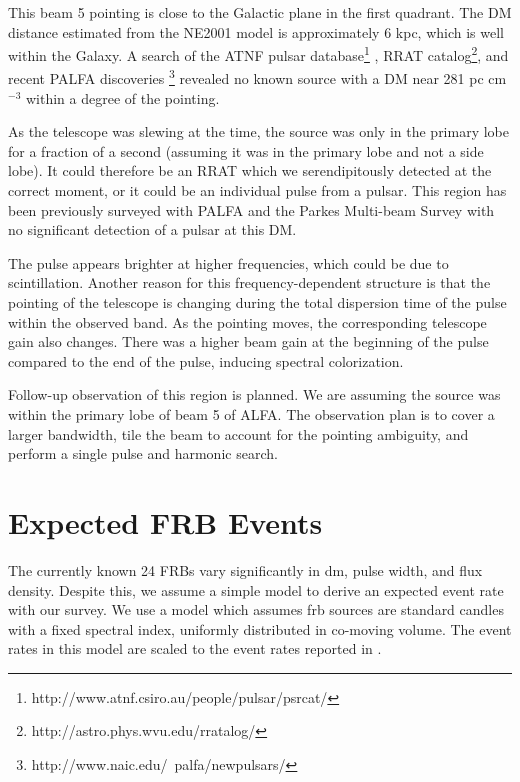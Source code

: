 \documentclass[a4paper,fleqn,usenatbib]{mnras}
\begin{document}
This beam 5 pointing is close to the Galactic plane in the first quadrant. The
DM distance estimated from the NE2001 model \citep{2002astro.ph..7156C} is
approximately 6 kpc, which is well within the Galaxy. A search of the ATNF
pulsar database\footnote{http://www.atnf.csiro.au/people/pulsar/psrcat/}
\citep{2005AJ....129.1993M}, RRAT
catalog\footnote{http://astro.phys.wvu.edu/rratalog/}, and recent PALFA
discoveries \footnote{http://www.naic.edu/~palfa/newpulsars/} revealed no known
source with a DM near 281 pc cm$^{-3}$ within a degree of the pointing.

As the telescope was slewing at the time, the source was only in the
primary lobe for a fraction of a second (assuming it was in the
primary lobe and not a side lobe). It could therefore be an RRAT which
we serendipitously detected at the correct moment, or it could be an
individual pulse from a pulsar. This region has been previously
surveyed with PALFA and the Parkes Multi-beam Survey
\citep{2001MNRAS.328...17M} with no significant detection of a pulsar
at this DM.

The pulse appears brighter at higher frequencies, which could be due
to scintillation. Another reason for this frequency-dependent
structure is that the pointing of the telescope is changing during the
total dispersion time of the pulse within the observed band. As the
pointing moves, the corresponding telescope gain also changes.  There
was a higher beam gain at the beginning of the pulse compared to the
end of the pulse, inducing spectral colorization.

Follow-up observation of this region is planned. We are assuming the source was
within the primary lobe of beam 5 of ALFA. The observation plan is to cover a
larger bandwidth, tile the beam to account for the pointing ambiguity, and
perform a single pulse and harmonic search.



\section{Expected FRB Events}
\label{sec:event_rates}

The currently known 24 FRBs vary significantly in \gls{dm}, pulse
width, and flux density. Despite this, we assume a simple model to
derive an expected event rate with our survey.  We use a model
\citep{2013MNRAS.436L...5L} which assumes \gls{frb} sources are
standard candles with a fixed spectral index, uniformly distributed in
co-moving volume. The event rates in this model are scaled to the
event rates reported in \cite{2013Sci...341...53T}. 
\end{document}
